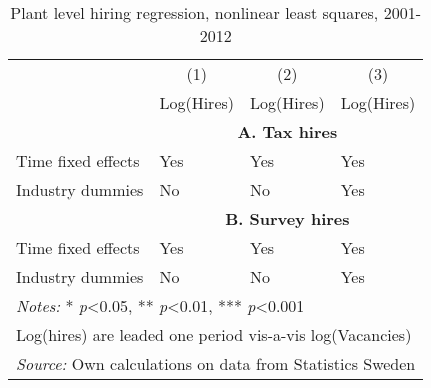 \begin{table}[htbp]\centering
\def\sym#1{\ifmmode^{#1}\else\(^{#1}\)\fi}
\caption{Plant level hiring regression, nonlinear least squares, 2001-2012}
\label{tab:main_nls}
\begin{tabular}{llll}
\hline\hline
                &\multicolumn{1}{c}{(1)}&\multicolumn{1}{c}{(2)}&\multicolumn{1}{c}{(3)}\\
                &\multicolumn{1}{c}{Log(Hires)}&\multicolumn{1}{c}{Log(Hires)}&\multicolumn{1}{c}{Log(Hires)}\\
\hline

\hline
			    &\multicolumn{3}{c}{\textbf{A. Tax hires}} \\
\hline


\hline 
Time fixed effects  &         Yes         &         Yes         &         Yes                      \\
[1em]
Industry dummies    &          No         &          No         &         Yes               \\
[1em]
\hline 


\hline
			    &\multicolumn{3}{c}{\textbf{B. Survey hires}} \\
\hline


\hline 
Time fixed effects  &         Yes         &         Yes         &         Yes                      \\
[1em]
Industry dummies    &          No         &          No         &         Yes               \\
[1em]
\hline 


\hline\hline
\multicolumn{4}{l}{\footnotesize \emph{Notes:} * \emph{p}<0.05, ** \emph{p}<0.01, *** \emph{p}<0.001}\\
\multicolumn{4}{l}{\footnotesize Log(hires) are leaded one period vis-a-vis log(Vacancies)}\\
\multicolumn{4}{l}{\footnotesize \emph{Source:} Own calculations on data from Statistics Sweden}\\
\end{tabular}
\end{table}
